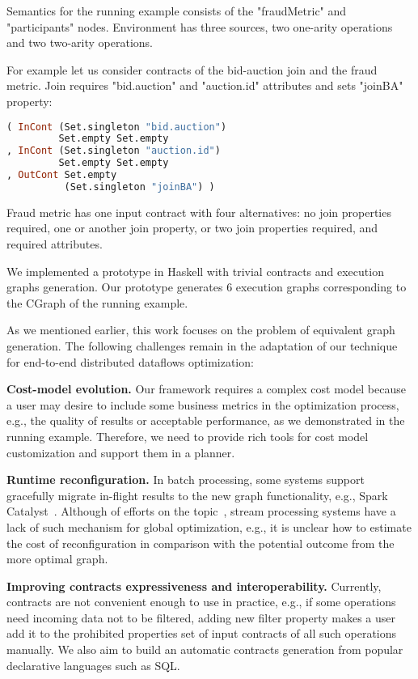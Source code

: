 Semantics for the running example consists of the "fraudMetric" and "participants" nodes.
Environment has three sources, two one-arity operations and two two-arity operations.

For example let us consider contracts of the bid-auction join and the fraud metric.
Join requires "bid.auction" and "auction.id" attributes and sets "joinBA" property:
\begin{lstlisting}[language=Haskell]
( InCont (Set.singleton "bid.auction")
         Set.empty Set.empty
, InCont (Set.singleton "auction.id")
         Set.empty Set.empty
, OutCont Set.empty
          (Set.singleton "joinBA") )
\end{lstlisting}

Fraud metric has one input contract with four alternatives: no join properties required, one or another join property, or two join properties required, and required attributes.

We implemented a prototype in Haskell with trivial contracts and execution graphs generation.
Our prototype generates 6 execution graphs corresponding to the CGraph of the running example.

As we mentioned earlier, this work focuses on the problem of equivalent graph generation. The following challenges remain in the adaptation of our technique for end-to-end distributed dataflows optimization:

\textbf{Cost-model evolution.}
Our framework requires a complex cost model because a user may desire to include some business metrics in the optimization process, e.g., the quality of results or acceptable performance, as we demonstrated in the running example. Therefore, we need to provide rich tools for cost model customization and support them in a planner.

\textbf{Runtime reconfiguration.}
In batch processing, some systems support gracefully migrate in-flight results to the new graph functionality, e.g., Spark Catalyst~\cite{armbrust2015spark}. Although of efforts on the topic~\cite{10.14778/3329772.3329777, grulich2020grizzly}, stream processing systems have a lack of such mechanism for global optimization, e.g., it is unclear how to estimate the cost of reconfiguration in comparison with the potential outcome from the more optimal graph.

\textbf{Improving contracts expressiveness and interoperability.}
Currently, contracts are not convenient enough to use in practice, e.g., if some operations need incoming data not to be filtered, adding new filter property makes a user add it to the prohibited properties set of input contracts of all such operations manually. We also aim to build an automatic contracts generation from popular declarative languages such as SQL.